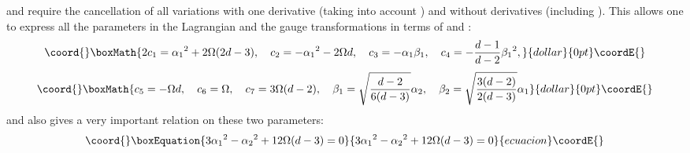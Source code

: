 \documentclass[a4paper,12pt]{article}
\begin{document}
and require the cancellation of all variations with one derivative
(taking into account \coordHE{}) and without derivatives
(including \coordHE{}). This allows one
to express all the parameters in the Lagrangian and the gauge
transformations in terms of \coordHE{} and \coordHE{}:
$$\coord{}\boxMath{
2c_1 = \alpha_1{}^2 + 2 \Omega(2d-3), \quad
c_2 = - \alpha_1{}^2 - 2 \Omega d, \quad
c_3 = - \alpha_1 \beta_1, \quad c_4 = - \frac{d-1}{d-2} \beta_1{}^2,
}{dollar}{0pt}\coordE{}$$  $$\coord{}\boxMath{
c_5 = - \Omega d, \quad c_6 = \Omega, \quad c_7 = 3 \Omega (d-2), \quad
\beta_1 = \sqrt{\frac{d-2}{6(d-3)}} \alpha_2, \quad
\beta_2 = \sqrt{\frac{3(d-2)}{2(d-3)}} \alpha_1
}{dollar}{0pt}\coordE{}$$
and also gives a very important relation on these two parameters:
\begin{equation}\coord{}\boxEquation{
3 \alpha_1{}^2 - \alpha_2{}^2 + 12 \Omega (d-3) = 0
}{
3 \alpha_1{}^2 - \alpha_2{}^2 + 12 \Omega (d-3) = 0
}{ecuacion}\coordE{}\end{equation}
\end{document}
